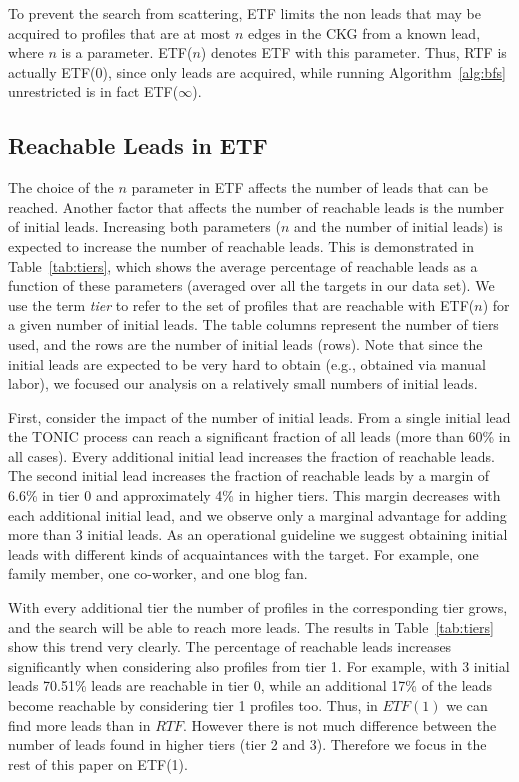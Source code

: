 \documentclass[prodmode,acmtecs]{acmsmall} %
\begin{document}
To prevent the search from scattering, ETF limits the non leads that may be acquired to profiles that are at most $n$ edges in the CKG from a known lead, where $n$ is a parameter. ETF($n$) denotes ETF with this parameter. Thus, RTF is actually ETF(0), since only leads are acquired, while running Algorithm~\ref{alg:bfs} unrestricted is in fact ETF($\infty$). 

\subsection{Reachable Leads in ETF}
The choice of the $n$ parameter in ETF affects the number of leads that can be reached. Another factor that affects the number of reachable leads is the number of initial leads. 
Increasing both parameters ($n$ and the number of initial leads) is expected to increase the number of reachable leads. This is demonstrated in Table~\ref{tab:tiers}, which shows the average percentage of reachable leads as a function of these parameters (averaged over all the targets in our data set). We use the term {\em tier} to refer to the set of profiles that are reachable with ETF($n$) for a given number of initial leads.
The table columns represent the number of tiers used, and the rows are the number of initial leads (rows). Note that since the initial leads are expected to be very hard to obtain (e.g., obtained via manual labor), we focused our analysis on a relatively small numbers of initial leads.


First, consider the impact of the number of initial leads. 
From a single initial lead the TONIC process can reach a significant fraction of all leads (more than 60\% in all cases). 
Every additional initial lead increases the fraction of reachable leads. 
The second initial lead increases the fraction of reachable leads by a margin of 6.6\% in tier 0 and approximately 4\% in higher tiers. 
This margin decreases with each additional initial lead, and we observe only a marginal advantage for adding more than 3 initial leads. 
As an operational guideline we suggest obtaining initial leads with different kinds of acquaintances with the target. For example, one family member, one co-worker, and one blog fan. 


With every additional tier the number of profiles in the corresponding tier grows, and the search will be able to reach more leads. The results in Table~\ref{tab:tiers} show this trend very clearly. The percentage of reachable leads increases significantly when considering also profiles from tier 1. For example, with 3 initial leads 70.51\% leads are reachable in tier 0, while an additional 17\% of the leads become reachable by considering tier 1 profiles too. Thus, in \(ETF(1)\) we can find more leads than in \(RTF\). However there is not much difference between the number of leads found in higher tiers (tier 2 and 3). Therefore we focus in the rest of this paper on ETF(1). 
\end{document}
